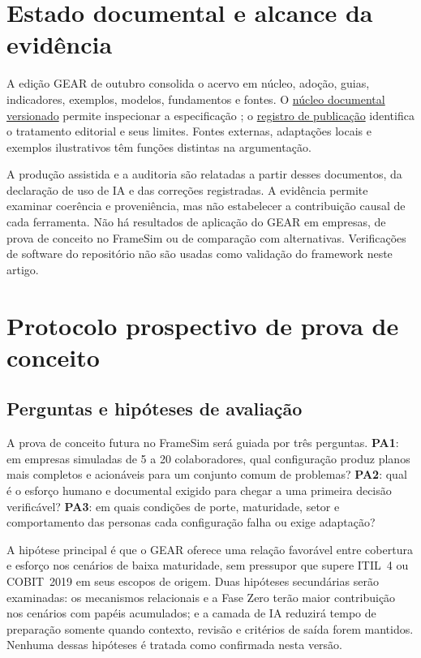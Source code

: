 \section{Estado documental e alcance da evidência}
\label{sec:estado}

A edição GEAR de outubro consolida o acervo em núcleo, adoção, guias, indicadores, exemplos, modelos, fundamentos e fontes. O \href{https://github.com/andrecodexvictor/GP-Pme/tree/8386586af110ba2112694a8ee6dd7b9d94d20572/framework}{núcleo documental versionado} permite inspecionar a especificação \citep{gppme2026repo}; o \href{https://github.com/andrecodexvictor/GP-Pme/tree/codex/gear-editorial/framework/publicacao}{registro de publicação} identifica o tratamento editorial e seus limites. Fontes externas, adaptações locais e exemplos ilustrativos têm funções distintas na argumentação.

A produção assistida e a auditoria são relatadas a partir desses documentos, da declaração de uso de IA e das correções registradas. A evidência permite examinar coerência e proveniência, mas não estabelecer a contribuição causal de cada ferramenta. Não há resultados de aplicação do GEAR em empresas, de prova de conceito no FrameSim ou de comparação com alternativas. Verificações de software do repositório não são usadas como validação do framework neste artigo.

\section{Protocolo prospectivo de prova de conceito}
\label{sec:protocolo}

\subsection{Perguntas e hipóteses de avaliação}

A prova de conceito futura no FrameSim será guiada por três perguntas. \textbf{PA1}: em empresas simuladas de 5 a 20 colaboradores, qual configuração produz planos mais completos e acionáveis para um conjunto comum de problemas? \textbf{PA2}: qual é o esforço humano e documental exigido para chegar a uma primeira decisão verificável? \textbf{PA3}: em quais condições de porte, maturidade, setor e comportamento das personas cada configuração falha ou exige adaptação?

A hipótese principal é que o GEAR oferece uma relação favorável entre cobertura e esforço nos cenários de baixa maturidade, sem pressupor que supere ITIL~4 ou COBIT~2019 em seus escopos de origem. Duas hipóteses secundárias serão examinadas: os mecanismos relacionais e a Fase Zero terão maior contribuição nos cenários com papéis acumulados; e a camada de IA reduzirá tempo de preparação somente quando contexto, revisão e critérios de saída forem mantidos. Nenhuma dessas hipóteses é tratada como confirmada nesta versão.


